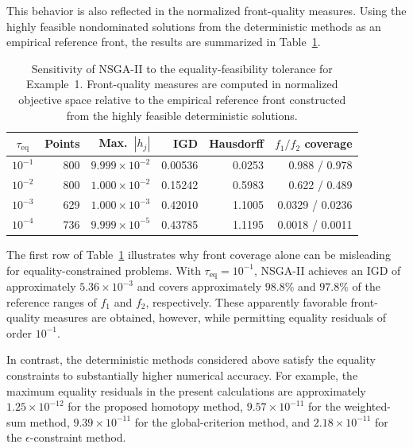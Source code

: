 \documentclass[11pt,pdflatex,sn-mathphys-ay]{sn-jnl}%
\theoremstyle{definition}
\theoremstyle{thmstyleone}%
\theoremstyle{thmstyletwo}%
\theoremstyle{thmstylethree}%
\newcommand{\add}[1]{\textcolor{revisionblue}{#1}}
\begin{document}
	\add{This behavior is also reflected in the normalized front-quality
		measures. Using the highly feasible nondominated solutions from the
		deterministic methods as an empirical reference front, the results are
		summarized in Table~\ref{tab:nsga-tolerance}.}
	
	\begin{table}[htbp]
		\centering
		\caption{Sensitivity of NSGA-II to the equality-feasibility tolerance
			for Example~1. Front-quality measures are computed in normalized
			objective space relative to the empirical reference front constructed
			from the highly feasible deterministic solutions.}
		\label{tab:nsga-tolerance}
		\begin{tabular}{c r r r r r}
			\hline
			$\tau_{\mathrm{eq}}$
			& Points
			& Max.\ $|h_j|$
			& IGD
			& Hausdorff
			& $f_1/f_2$ coverage \\
			\hline
			$10^{-1}$
			& 800
			& $9.999\times10^{-2}$
			& 0.00536
			& 0.0253
			& 0.988 / 0.978 \\
			
			$10^{-2}$
			& 800
			& $1.000\times10^{-2}$
			& 0.15242
			& 0.5983
			& 0.622 / 0.489 \\
			
			$10^{-3}$
			& 629
			& $1.000\times10^{-3}$
			& 0.42010
			& 1.1005
			& 0.0329 / 0.0236 \\
			
			$10^{-4}$
			& 736
			& $9.999\times10^{-5}$
			& 0.43785
			& 1.1195
			& 0.0018 / 0.0011 \\
			\hline
		\end{tabular}
	\end{table}
	
	\add{The first row of Table~\ref{tab:nsga-tolerance} illustrates why front
		coverage alone can be misleading for equality-constrained problems.
		With $\tau_{\mathrm{eq}}=10^{-1}$, NSGA-II achieves an IGD of
		approximately $5.36\times10^{-3}$ and covers approximately
		$98.8\%$ and $97.8\%$ of the reference ranges of $f_1$ and $f_2$,
		respectively. These apparently favorable front-quality measures are
		obtained, however, while permitting equality residuals of order
		$10^{-1}$.}
	
	\add{In contrast, the deterministic methods considered above satisfy the
		equality constraints to substantially higher numerical accuracy. For
		example, the maximum equality residuals in the present calculations are
		approximately $1.25\times10^{-12}$ for the proposed homotopy method,
		$9.57\times10^{-11}$ for the weighted-sum method,
		$9.39\times10^{-11}$ for the global-criterion method, and
		$2.18\times10^{-11}$ for the $\epsilon$-constraint method.}
	
\end{document}
